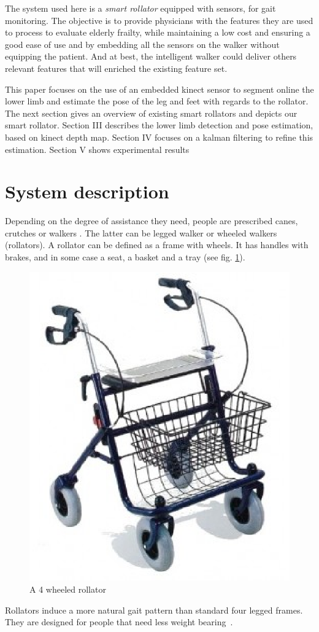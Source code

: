 \documentclass[letterpaper, 10 pt, conference]{ieeeconf}
\newcommand{\CDOK}[2]{{#1}} %
\begin{document}
The system used here is a \textit{smart rollator} equipped with sensors, for gait monitoring. The objective is to provide physicians with the features they are used to process to evaluate elderly frailty,  while maintaining a low cost  and ensuring a good ease of use and by embedding all the sensors on the walker without equipping the patient. And at best, the intelligent walker could deliver others relevant features that will enriched the existing feature set. 

\CDOK{This paper focuses on the use of an embedded kinect sensor to segment online the lower limb and estimate the pose of the leg and feet with regards to the rollator. The next section gives an overview of existing smart rollators and depicts our smart rollator. Section III describes the lower limb detection and pose estimation, based on kinect depth map. Section IV focuses on a kalman filtering to refine this estimation. Section V shows experimental results  }{}

\section{System description}

Depending on the degree of assistance they need, people are prescribed canes, crutches or walkers \cite{Joyce91}. The latter can be legged walker or wheeled walkers (rollators). A rollator can be defined as a frame with wheels. It has handles with brakes, and in some case a seat, a basket and a tray (see fig. \ref{fig:rollator}).

\begin{figure}[h]
	\centering
	\includegraphics[width=0.45\columnwidth]{images/rollator.eps}
	\caption{A 4 wheeled rollator}
	\label{fig:rollator}
\end{figure}

Rollators induce a more natural gait pattern than standard four legged frames. They are designed for people that need less weight bearing~\cite{VanHook03}.
\end{document}
